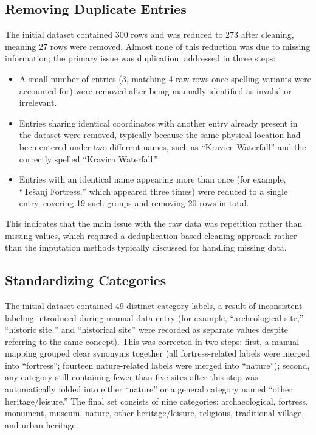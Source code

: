 \documentclass[conference]{IEEEtran}
\begin{document}
\subsection{Removing Duplicate Entries}
The initial dataset contained 300 rows and was reduced to 273 after cleaning, meaning 27 rows were removed. Almost none of this reduction was due to missing information; the primary issue was duplication, addressed in three steps:
\begin{itemize}
\item A small number of entries (3, matching 4 raw rows once spelling variants were accounted for) were removed after being manually identified as invalid or irrelevant.
\item Entries sharing identical coordinates with another entry already present in the dataset were removed, typically because the same physical location had been entered under two different names, such as ``Kravice Waterfall'' and the correctly spelled ``Kravica Waterfall.''
\item Entries with an identical name appearing more than once (for example, ``Te\v{s}anj Fortress,'' which appeared three times) were reduced to a single entry, covering 19 such groups and removing 20 rows in total.
\end{itemize}
This indicates that the main issue with the raw data was repetition rather than missing values, which required a deduplication-based cleaning approach rather than the imputation methods typically discussed for handling missing data.

\subsection{Standardizing Categories}
The initial dataset contained 49 distinct category labels, a result of inconsistent labeling introduced during manual data entry (for example, ``archeological site,'' ``historic site,'' and ``historical site'' were recorded as separate values despite referring to the same concept). This was corrected in two steps: first, a manual mapping grouped clear synonyms together (all fortress-related labels were merged into ``fortress''; fourteen nature-related labels were merged into ``nature''); second, any category still containing fewer than five sites after this step was automatically folded into either ``nature'' or a general category named ``other heritage/leisure.'' The final set consists of nine categories: archaeological, fortress, monument, museum, nature, other heritage/leisure, religious, traditional village, and urban heritage.
\end{document}
